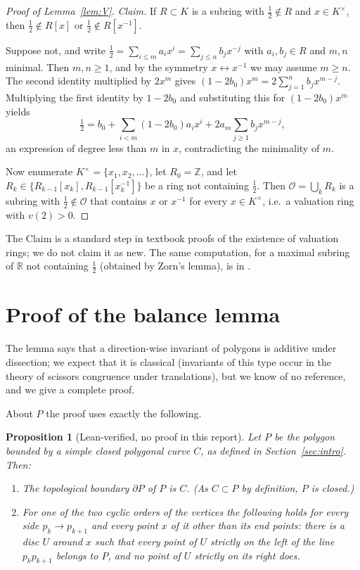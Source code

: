\documentclass[11pt]{article}
\newtheorem{proposition}[theorem]{Proposition}
\theoremstyle{definition}
\newcommand{\Z}{\mathbb{Z}}
\newcommand{\R}{\mathbb{R}}
\newcommand{\cO}{\mathcal{O}}
\begin{document}
\begin{proof}[Proof of Lemma~\ref{lem:V}]
\emph{Claim.} If $R\subset K$ is a subring with $\tfrac12\notin R$ and $x\in K^\times$, then
$\tfrac12\notin R[x]$ or $\tfrac12\notin R[x^{-1}]$.

Suppose not, and write $\tfrac12=\sum_{i\le m}a_ix^i=\sum_{j\le n}b_jx^{-j}$ with $a_i,b_j\in R$ and
$m,n$ minimal. Then $m,n\ge1$, and by the symmetry $x\leftrightarrow x^{-1}$ we may assume $m\ge n$.
The second identity multiplied by $2x^m$ gives $(1-2b_0)x^m=2\sum_{j=1}^nb_jx^{m-j}$. Multiplying the
first identity by $1-2b_0$ and substituting this for $(1-2b_0)x^m$ yields
\[ \tfrac12=b_0+\sum_{i<m}(1-2b_0)a_ix^i+2a_m\sum_{j\ge1}b_jx^{m-j}, \]
an expression of degree less than $m$ in $x$, contradicting the minimality of $m$.

Now enumerate $K^\times=\{x_1,x_2,\dots\}$, let $R_0=\Z$, and let
$R_k\in\{R_{k-1}[x_k],R_{k-1}[x_k^{-1}]\}$ be a ring not containing $\tfrac12$. Then
$\cO=\bigcup_kR_k$ is a subring with $\tfrac12\notin\cO$ that contains $x$ or $x^{-1}$ for every
$x\in K^\times$, i.e.\ a valuation ring with $v(2)>0$.
\end{proof}

The Claim is a standard step in textbook proofs of the existence of valuation rings; we do not claim
it as new. The same computation, for a maximal subring of $\R$ not containing $\tfrac12$ (obtained
by Zorn's lemma), is in \cite[pp.~161--162]{AZ}.

\section{Proof of the balance lemma}\label{sec:proofB}

The lemma says that a direction-wise invariant of polygons is additive under dissection; we expect
that it is classical (invariants of this type occur in the theory of scissors congruence under
translations), but we know of no reference, and we give a complete proof.

About $P$ the proof uses exactly the following.

\begin{proposition}[Lean-verified, no proof in this report]\label{fact:P}
Let $P$ be the polygon bounded by a simple closed polygonal curve $C$, as defined in
Section~\ref{sec:intro}. Then:
\begin{enumerate}[label=(P\arabic*)]
\item The topological boundary $\partial P$ of $P$ is $C$. (As $C\subset P$ by definition, $P$ is
closed.)
\item For one of the two cyclic orders of the vertices the following holds for every side
$p_k\to p_{k+1}$ and every point $x$ of it other than its end points: there is a disc $U$ around
$x$ such that every point of $U$ strictly on the left of the line $p_kp_{k+1}$ belongs to $P$, and
no point of $U$ strictly on its right does.
\end{enumerate}
\end{proposition}
\end{document}

